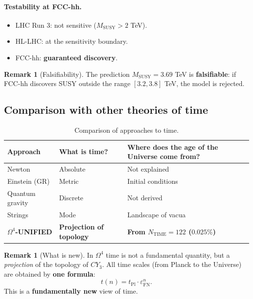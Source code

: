 \documentclass[11pt,a4paper]{article}
\newcommand{\CY}{CY_3}
\newcommand{\Om}{\Omega^4}
\newcommand{\MSUSY}{M_{\text{SUSY}}}
\newcommand{\epsFN}{\varepsilon_{\text{FN}}}
\theoremstyle{definition}
\newtheorem{remark}[theorem]{Remark}
\begin{document}
\paragraph{Testability at FCC-hh.}
\begin{itemize}
    \item LHC Run 3: not sensitive ($\MSUSY > 2$ TeV).
    \item HL-LHC: at the sensitivity boundary.
    \item FCC-hh: \textbf{guaranteed discovery}.
\end{itemize}

\begin{remark}[Falsifiability]
\label{rem:falsifiability-review}
The prediction $\MSUSY = 3.69$ TeV is \textbf{falsifiable}: 
if FCC-hh discovers SUSY outside the range $[3.2, 3.8]$ TeV, 
the model is rejected.
\end{remark}

\subsection{Comparison with other theories of time}
\label{subsec:time-comparison}

\begin{table}[htbp]
\centering
\caption{Comparison of approaches to time.}
\label{tab:time-comparison}
\begin{tabular}{p{3.5cm}p{4cm}p{5cm}}
\toprule
Approach & What is time? & Where does the age of the Universe come from? \\
\midrule
Newton & Absolute & Not explained \\
Einstein (GR) & Metric & Initial conditions \\
Quantum gravity & Discrete & Not derived \\
Strings & Mode & Landscape of vacua \\
\textbf{$\Om$-UNIFIED} & \textbf{Projection of topology} & 
    \textbf{From $N_{\text{TIME}} = 122$ ($0.025\%$)} \\
\bottomrule
\end{tabular}
\end{table}

\begin{remark}[What is new]
\label{rem:time-new}
In $\Om$ time is not a fundamental quantity, but a \emph{projection} 
of the topology of $\CY$. All time scales (from Planck to the Universe) 
are obtained by \textbf{one formula}:
\begin{equation}
    t(n) = t_{\text{Pl}} \cdot \epsFN^n.
\end{equation}
This is a \textbf{fundamentally new} view of time.
\end{remark}
\end{document}
